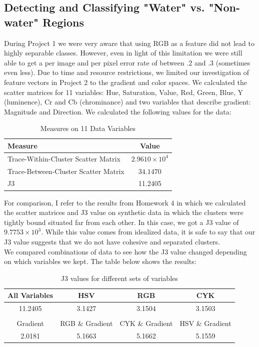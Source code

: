 \documentclass[12pt]{article}
\begin{document}
	\subsection{Detecting and Classifying "Water" vs. "Non-water" Regions}
	During Project 1 we were very aware that using RGB as a feature did not lead to highly separable classes. However, even in light of this limitation we were still able to get a per image and per pixel error rate of between .2 and .3 (sometimes even less). Due to time and resource restrictions, we limited our investigation of feature vectors in Project 2 to the gradient and color spaces. 
	We calculated the scatter matrices for 11 variables: Hue, Saturation, Value, Red, Green, Blue, Y (luminence), Cr and Cb (chrominance) and two variables that describe gradient: Magnitude and Direction. 
	We calculated the following values for the data:
	\begin{table}[h]
		\centering
		\begin{tabular}{|l|c|}
		\hline
		Measure & Value\\
		\hline
		Trace-Within-Cluster Scatter Matrix & $2.9610 \times 10^4$\\
		Trace-Between-Cluster Scatter Matrix & $34.1470$\\
		J3 & 11.2405\\
		\hline
		\end{tabular}
		\caption{Measures on 11 Data Variables}
	\end{table}
	For comparison, I refer to the results from Homework 4 in which we calculated the scatter matrices and J3 value on synthetic data in which the clusters were tightly bound situated far from each other. In this case, we got a J3 value of $9.7753 \times 10^3$. While this value comes from idealized data, it is safe to say that our J3 value suggests that we do not have cohesive and separated clusters.\\
	We compared combinations of data to see how the J3 value changed depending on which variables we kept. The table below shows the results:\\
	\begin{table}[h]
		\centering
		\begin{tabular}{|c|c|c|c|}
			\hline
			All Variables & HSV & RGB & CYK\\
			\hline
			\hline
			11.2405 & 3.1427 & 3.1504 & 3.1503\\
			& & &\\
			\hline
			Gradient & RGB \& Gradient & CYK \& Gradient & HSV \& Gradient\\	
			\hline
			\hline
			2.0181 & 5.1663 & 5.1662 & 5.1559	\\
			\hline
		\end{tabular}
		\caption{J3 values for different sets of variables}
	\end{table}
\end{document}
